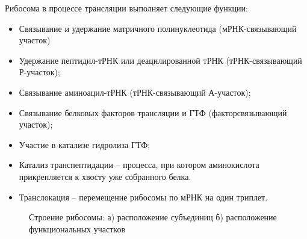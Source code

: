 Рибосома в процессе трансляции выполняет следующие функции:  

\begin{itemize}
    \item Связывание  и удержание  матричного полинуклеотида  (мРНК-связывающий участок)
    
    \item Удержание  пептидил-тРНК    или   деацилированной тРНК  (тРНК-связывающий  Р-участок);
    
    \item Связывание  аминоацил-тРНК  (тРНК-связывающий А-участок);
    
    \item Связывание  белковых  факторов  трансляции  и  ГТФ (факторсвязывающий  участок);
    
    \item Участие в катализе гидролиза ГТФ;
    
    \item Катализ транспептидации -- процесса, при котором аминокислота прикрепляется к хвосту уже собранного белка.
    
    \item Транслокация -- перемещение рибосомы по мРНК на один триплет.
\end{itemize}



\begin{figure}[h]
\begin{minipage}[h]{0.5\linewidth}
\end{minipage}
\hfill
\begin{minipage}[h]{0.5\linewidth}
\end{minipage}
\caption{Строение рибосомы: а) расположение субъединиц б) расположение функциональных участков}
\label{fig:5_24}
\end{figure}


